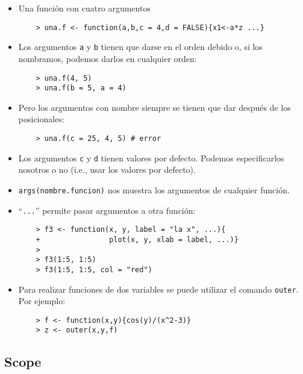 \begin{itemize}
    \item Una función con cuatro argumentos
    \begin{verbatim}
    > una.f <- function(a,b,c = 4,d = FALSE){x1<-a*z ...}
    \end{verbatim}

    \item Los argumentos \verb"a" y \verb"b" tienen que darse en el
    orden debido o, si los nombramos, podemos darlos en cualquier orden:
    \begin{verbatim}
    > una.f(4, 5)
    > una.f(b = 5, a = 4)
    \end{verbatim}

    \item Pero los argumentos con nombre siempre se tienen que dar
    después de los posicionales:
    \begin{verbatim}
    > una.f(c = 25, 4, 5) # error
    \end{verbatim}

    \item Los argumentos \verb"c" y \verb"d" tienen valores por defecto.
    Podemos especificarlos nosotros o no (i.e., usar los valores por defecto).

    \newslide

    \item \verb"args(nombre.funcion)" nos muestra los argumentos de cualquier función.

    \item ``\verb"..."'' permite pasar argumentos a otra función:
    \begin{verbatim}
    > f3 <- function(x, y, label = "la x", ...){
    +                plot(x, y, xlab = label, ...)}
    >
    > f3(1:5, 1:5)
    > f3(1:5, 1:5, col = "red")
    \end{verbatim}

    \item Para realizar funciones de dos variables se puede utilizar
    el comando \verb"outer". Por ejemplo:
    \begin{verbatim}
    > f <- function(x,y){cos(y)/(x^2-3)}
    > z <- outer(x,y,f)
    \end{verbatim}

\end{itemize}

\newslide

\subsection{Scope}

